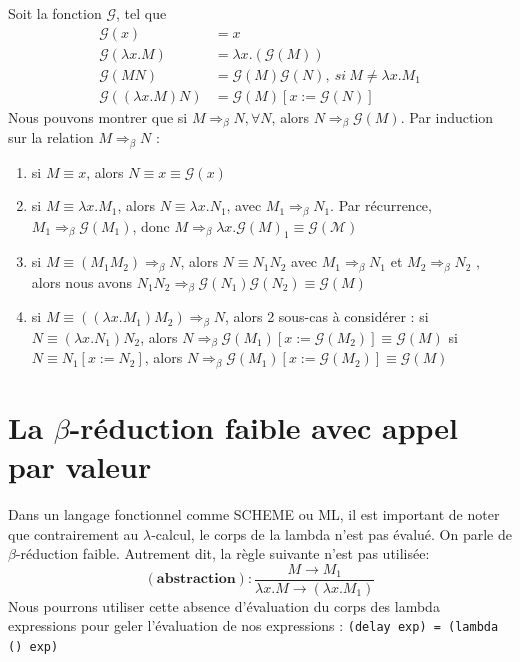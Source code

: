 \documentclass[11pt]{book}
\begin{document}
Soit la fonction $\mathcal{G}$, tel que 
\begin{align}
	\mathcal{G}(x)&=x \\
	\mathcal{G}(\lambda x.M) &= \lambda x.(\mathcal{G}(M)) \\
	\mathcal{G}(MN)&= \mathcal{G}(M)\mathcal{G}(N), \ si\ M \neq \lambda x.M_1 \\
	 \mathcal{G}((\lambda x.M)N) &= \mathcal{G}(M)[x:=\mathcal{G}(N)]  
\end{align}
Nous pouvons montrer que si $M  \Rightarrow _\beta N, \forall N$, alors
$N  \Rightarrow  _\beta \mathcal{G}(M)$.
Par induction sur la relation $M  \Rightarrow _\beta N$  :
 \begin{enumerate}
	\item si $M \equiv x$, alors $N \equiv x \equiv \mathcal{G}(x)$

	\item si $M \equiv \lambda x.M_1$, alors $N \equiv \lambda x.N_1$, avec $M_1  \Rightarrow _\beta N_1$. 
	Par récurrence, $M_1  \Rightarrow _\beta \mathcal{G}(M_1)$, donc $M  \Rightarrow _\beta \lambda x.\mathcal{G}(M)_1 \equiv
	\mathcal{G(M)}$

	\item si $M\equiv (M_1 M_2)  \Rightarrow _\beta  N $, alors $N \equiv N_1 N_2$ 
	avec $M_1 \Rightarrow _\beta N_1$ et  $M_2 \Rightarrow _\beta N_2$ , alors nous avons
	 $N_1 N_2 \Rightarrow _\beta \mathcal{G}(N_1) \mathcal{G}(N_2) \equiv \mathcal{G}(M)$

	 \item si $M\equiv ((\lambda x.M_1)M_2) \Rightarrow _\beta N$, alors 2 sous-cas à considérer :
	 \subitem 
	      si $N \equiv (\lambda x.N_1)N_2$, alors $N \Rightarrow _\beta \mathcal{G}(M_1)[x:=\mathcal{G}(M_2)] \equiv \mathcal{G}(M)$
	 \subitem 
	      si $N \equiv N_1[x:=N_2]$, alors $N \Rightarrow _\beta \mathcal{G}(M_1)[x:=\mathcal{G}(M_2)] \equiv \mathcal{G}(M)$ 


\end{enumerate}


\section{La $\beta$-réduction faible avec appel par valeur}
Dans un langage fonctionnel comme SCHEME ou ML, il est important de noter que contrairement au $\lambda$-calcul, le corps de la lambda n'est pas \'{e}valu\'{e}. 
On parle de $\beta$-réduction faible.  
Autrement dit, la règle suivante n'est pas utilisée:
$$\mathbf{(abstraction)} : \frac{M \rightarrow M_1}{ \lambda x.M \rightarrow (\lambda x.M_1)}$$
Nous pourrons utiliser cette absence d'\'{e}valuation du corps 
des lambda expressions pour geler l'\'{e}valuation de nos expressions : \verb+(delay exp) = (lambda () exp)+ 
\end{document}
